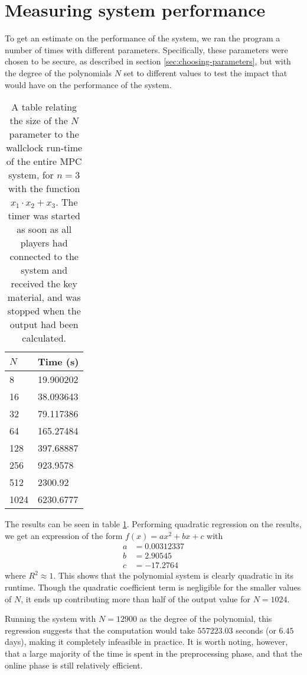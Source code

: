 \documentclass[../main.tex]{subfiles}
\begin{document}
\section{Measuring system performance}
To get an estimate on the performance of the system, we ran the program a number of times with different parameters. Specifically, these parameters were chosen to be secure, as described in section \ref{sec:choosing-parameters}, but with the degree of the polynomials $N$ set to different values to test the impact that would have on the performance of the system.

\begin{table}
    \centering
    \begin{tabular}{l|l}
        $N$  & Time (s)  \\
        \hline
        8    & 19.900202 \\
        16   & 38.093643 \\
        32   & 79.117386 \\
        64   & 165.27484 \\
        128  & 397.68887 \\
        256  & 923.9578  \\
        512  & 2300.92   \\
        1024 & 6230.6777
    \end{tabular}
    \caption{A table relating the size of the $N$ parameter to the wallclock run-time of the entire MPC system, for $n = 3$ with the function $x_1 \cdot x_2 + x_3$. The timer was started as soon as all players had connected to the system and received the key material, and was stopped when the output had been calculated.}
    \label{tab:synthetic-division-performance}
\end{table}

The results can be seen in table \ref{tab:synthetic-division-performance}. Performing quadratic regression on the results, we get an expression of the form $f(x) = a x^2 + b x + c$ with
\begin{align*}
    a & = 0.00312337 \\
    b & = 2.90545    \\
    c & = -17.2764
\end{align*}
where $R^2 \approx 1$. This shows that the polynomial system is clearly quadratic in its runtime. Though the quadratic coefficient term is negligible for the smaller values of $N$, it ends up contributing more than half of the output value for $N = 1024$.

Running the system with $N = 12900$ as the degree of the polynomial, this regression suggests that the computation would take $557223.03$ seconds (or $6.45$ days), making it completely infeasible in practice.
It is worth noting, however, that a large majority of the time is spent in the preprocessing phase, and that the online phase is still relatively efficient.
\end{document}
